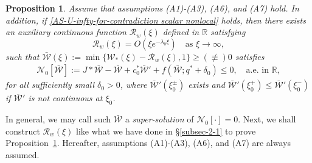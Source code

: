 \documentclass[11pt,a4paper]{article}
\newtheorem{proposition}[theorem]{\textbf{Proposition}}
\numberwithin{equation}{section}
\numberwithin{figure}{section}
\newcommand\bea{\begin{eqnarray}}
\newcommand\eea{\end{eqnarray}}
\begin{document}
\begin{proposition}\label{Prop-supersol nonlocal}
Assume that assumptions (A1)-(A3), (A6), and (A7) hold. In addition, if \eqref{AS-U-infty-for-contradiction scalar nonlocal} holds,
then there exists an auxiliary continuous function $\mathcal{R}_w(\xi)$ defined in $\mathbb{R}$ satisfying
\begin{equation}\label{decay rate of Rw nonlocal}
\mathcal{R}_w(\xi)=O(\xi e^{-\lambda_0\xi}) \quad \mbox{as $\xi\to\infty$},
\end{equation}
such that $\bar{\mathcal{W}}(\xi):=\min\{\mathcal{W}_{*}(\xi)-\mathcal{R}_w(\xi),1\}\geq (\not\equiv) 0$
satisfies
\bea\label{tw super solution scalar nonlocal}
\mathcal{N}_0[\bar{\mathcal{W}}]:=J\ast\bar{\mathcal{W}}-\bar{\mathcal{W}}+c^*_0\bar{\mathcal{W}}'+f(\bar{\mathcal{W}};q^*+\delta_0)\le0,\quad  \mbox{a.e. in $\mathbb{R}$},
\eea
for all sufficiently small $\delta_0>0$, where
${\bar{\mathcal{W}}}'(\xi_0^{\pm})$ exists and
${\bar{\mathcal{W}}}'(\xi_0^+)\leq {\bar{\mathcal{W}}}'(\xi_0^-)$
if $\bar{\mathcal{W}}'$ is not continuous at $\xi_0$.
\end{proposition}

In general, we may call such $\bar{\mathcal{W}}$ a {\em super-solution} of $\mathcal{N}_0[\cdot]=0$.
Next, we shall construct $\mathcal{R}_w(\xi)$ like what we have done in \S \ref{subsec-2-1} to prove Proposition~\ref{Prop-supersol nonlocal}.
Hereafter, assumptions (A1)-(A3), (A6), and (A7)  are always assumed.
\end{document}
